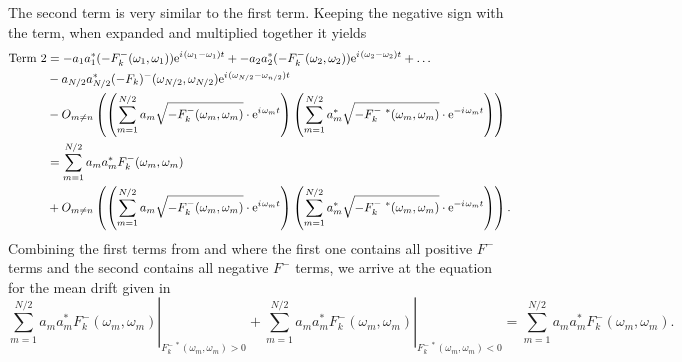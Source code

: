 The second term is very similar to the first term.  Keeping the negative sign with the term, when expanded and multiplied together it yields
\begin{align}
   \text{Term 2} &= - {a_1}{a_1^*} (-F_k^{-}(\omega_1,\omega_1)) \mathrm{e}^{{i\mkern1.5mu} (\omega_1 - \omega_1) t} +
                    - {a_2}{a_2^*} (-F_k^{-}(\omega_2,\omega_2)) \mathrm{e}^{{i\mkern1.5mu} (\omega_2 - \omega_2) t} + \ldots \nonumber\\
                 &- {a_{N/2}}{a_{N/2}^*} (-F_k)^{-}(\omega_{N/2},\omega_{N/2}) \mathrm{e}^{{i\mkern1.5mu} (\omega_{N/2} - \omega_{n/2}) t} \nonumber\\
                 &-  O_{m \ne n}\left(
                        \left(\sum\limits_{m=1}^{N/2}
                        {a_m} \sqrt{ - F_k^{-}(\omega_m,\omega_m)}
                        \cdot \mathrm{e}^{{i\mkern1.5mu} \omega_m t} \right)
                     \left( \sum\limits_{m=1}^{N/2}
                        {a_m^*} \sqrt{ - F_k^{-~*}(\omega_m,\omega_m)}
                        \cdot \mathrm{e}^{- {i\mkern1.5mu} \omega_m t} \right)\right) \nonumber\\
                 &= \sum\limits_{m=1}^{N/2} {a_m} {a_m^*} F_k^{-}(\omega_m,\omega_m) \nonumber\\
                 &+  O_{m \ne n}\left(
                        \left(\sum\limits_{m=1}^{N/2}
                        {a_m} \sqrt{ - F_k^{-}(\omega_m,\omega_m)}
                        \cdot \mathrm{e}^{{i\mkern1.5mu} \omega_m t} \right)
                     \left( \sum\limits_{m=1}^{N/2}
                        {a_m^*} \sqrt{ - F_k^{-~*}(\omega_m,\omega_m)}
                        \cdot \mathrm{e}^{- {i\mkern1.5mu} \omega_m t} \right)\right).
\label{eq:NewmanRevised2t2}
\end{align}
Combining the first terms from  and  where the first one contains all positive $F^-$ terms and the second contains all negative $F^-$ terms, we arrive at the equation for the mean drift given in 
\begin{equation}
        \left. \sum\limits_{m=1}^{N/2} {a_m} {a_m^*} F_k^{-}(\omega_m,\omega_m)\right|_{F_{k}^{-~*}(\omega_m,\omega_m) > 0}
      + \left. \sum\limits_{m=1}^{N/2} {a_m} {a_m^*} F_k^{-}(\omega_m,\omega_m)\right|_{F_{k}^{-~*}(\omega_m,\omega_m) < 0}
      =        \sum\limits_{m=1}^{N/2} {a_m} {a_m^*} F_k^{-}(\omega_m,\omega_m).
\label{eq:NewmanMnDrift}
\end{equation}

